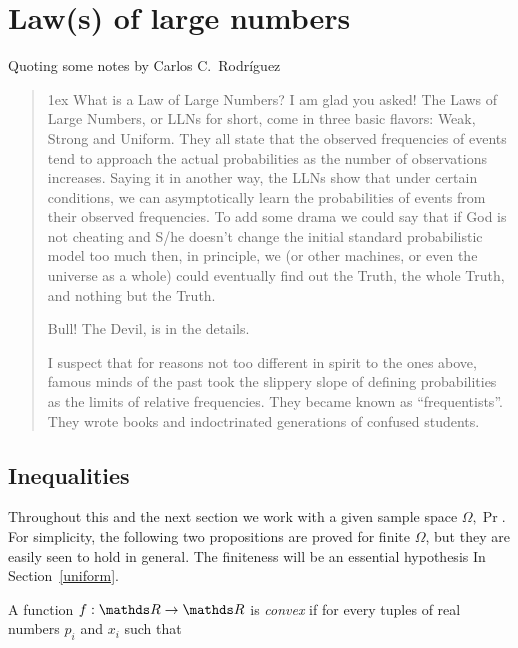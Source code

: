 \documentclass[scombinatorics.tex]{subfiles}
\begin{document}
\chapter{Law(s) of large numbers}
\label{ulln}



\def\medrel#1{\parbox[t]{5ex}{$\displaystyle\hfil #1$}}
\def\ceq#1#2#3{\parbox[t]{20ex}{$\displaystyle #1$}\medrel{#2}{$\displaystyle #3$}}

Quoting some notes by Carlos C.~Rodr\'iguez

\begin{quotation}\parindent0mm\parskip1ex\noindent
What is a Law of Large Numbers?
I am glad you asked! The Laws of Large Numbers, or LLNs for short, come in
three basic flavors: Weak, Strong and Uniform. They all state that the observed
frequencies of events tend to approach the actual probabilities as the number
of observations increases. Saying it in another way, the LLNs show that under
certain conditions, we can asymptotically learn the probabilities of events from
their observed frequencies. To add some drama we could say that if God is
not cheating and S/he doesn’t change the initial standard probabilistic model
too much then, in principle, we (or other machines, or even the universe as a
whole) could eventually find out the Truth, the whole Truth, and nothing but
the Truth.

Bull! The Devil, is in the details.

I suspect that for reasons not too different in spirit to the ones above, famous
minds of the past took the slippery slope of defining probabilities as the limits
of relative frequencies. They became known as “frequentists”. They wrote
books and indoctrinated generations of confused students.
\end{quotation}

\section{Inequalities}

Throughout this and the next section we work with a given sample space $\Omega,\Pr$.
For simplicity, the following two propositions are proved for finite $\Omega$, but they are easily seen to hold in  general.
The finiteness will be an essential hypothesis In Section~\ref{uniform}.

A function $f:\RR\to\RR$ is \emph{convex\/} if for every tuples of real numbers $p_i$ and $x_i$ such that
\end{document}
